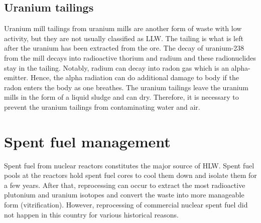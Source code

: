 \documentclass[nofootinbib,preprint,aip,pra]{revtex4-1}
\begin{document}
    \subsection{Uranium tailings}
    Uranium mill tailings from uranium mills are another form of waste with low activity, but
    they are not usually classified as LLW. The tailing is what is left after the uranium has been
    extracted from the ore. The decay of uranium-238 from the mill decays into
    radioactive thorium and radium and these radionuclides stay in the tailing. Notably, radium
    can decay into radon gas which is an alpha-emitter. Hence, the alpha radiation can do additional
    damage to body if the radon enters the body as one breathes.
    The uranium tailings leave the uranium mills in the form of a liquid sludge
    and can dry. Therefore, it is necessary to prevent the uranium tailings
    from contaminating water and air.
    
    \section{Spent fuel management}
    \label{sec:temp}
    Spent fuel from nuclear reactors constitutes the major source of HLW. Spent fuel pools at the
    reactors hold spent fuel cores to cool them down and isolate them for a few years. After that,
    reprocessing can occur to extract the most radioactive plutonium and uranium isotopes and
    convert the waste into more manageable form (vitrification). However, reprocessing of commercial
    nuclear spent fuel did not
    happen in this country for various historical reasons. 
\end{document}

